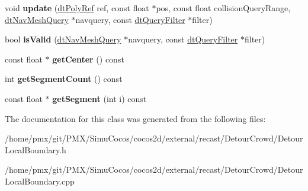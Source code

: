 \begin{DoxyCompactItemize}
\mbox{\label{classdtLocalBoundary_a270ef7f2e72520df6bd5c3a0e6b9a869}} 
void {\bfseries update} (\hyperlink{group__detour_gab4e0b2257a670c1a800057999612b466}{dt\+Poly\+Ref} ref, const float $\ast$pos, const float collision\+Query\+Range, \hyperlink{classdtNavMeshQuery}{dt\+Nav\+Mesh\+Query} $\ast$navquery, const \hyperlink{classdtQueryFilter}{dt\+Query\+Filter} $\ast$filter)
\item 
\mbox{\label{classdtLocalBoundary_add9a50788d1294903c1fdf98f440dfd1}} 
bool {\bfseries is\+Valid} (\hyperlink{classdtNavMeshQuery}{dt\+Nav\+Mesh\+Query} $\ast$navquery, const \hyperlink{classdtQueryFilter}{dt\+Query\+Filter} $\ast$filter)
\item 
\mbox{\label{classdtLocalBoundary_ab89e6bc9a4985f2c25e97fb1f70b6060}} 
const float $\ast$ {\bfseries get\+Center} () const
\item 
\mbox{\label{classdtLocalBoundary_a051ee9bba1b9e3bb563735d9ec047c7f}} 
int {\bfseries get\+Segment\+Count} () const
\item 
\mbox{\label{classdtLocalBoundary_a25ca9796be0ec6ff775a56f911c3fa17}} 
const float $\ast$ {\bfseries get\+Segment} (int i) const
\end{DoxyCompactItemize}


The documentation for this class was generated from the following files\+:\begin{DoxyCompactItemize}
\item 
/home/pmx/git/\+P\+M\+X/\+Simu\+Cocos/cocos2d/external/recast/\+Detour\+Crowd/Detour\+Local\+Boundary.\+h\item 
/home/pmx/git/\+P\+M\+X/\+Simu\+Cocos/cocos2d/external/recast/\+Detour\+Crowd/Detour\+Local\+Boundary.\+cpp\end{DoxyCompactItemize}
